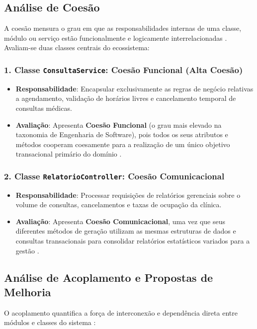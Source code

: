 \subsection{Análise de Coesão}

A coesão mensura o grau em que as responsabilidades internas de uma classe, módulo ou serviço estão funcionalmente e logicamente interrelacionadas \cite{larman2004}. Avaliam-se duas classes centrais do ecossistema:

\subsubsection{1. Classe \texttt{ConsultaService}: Coesão Funcional (Alta Coesão)}
\begin{itemize}
    \item \textbf{Responsabilidade}: Encapsular exclusivamente as regras de negócio relativas a agendamento, validação de horários livres e cancelamento temporal de consultas médicas.
    \item \textbf{Avaliação}: Apresenta \textbf{Coesão Funcional} (o grau mais elevado na taxonomia de Engenharia de Software), pois todos os seus atributos e métodos cooperam coesamente para a realização de um único objetivo transacional primário do domínio \cite{larman2004}.
\end{itemize}

\subsubsection{2. Classe \texttt{RelatorioController}: Coesão Comunicacional}
\begin{itemize}
    \item \textbf{Responsabilidade}: Processar requisições de relatórios gerenciais sobre o volume de consultas, cancelamentos e taxas de ocupação da clínica.
    \item \textbf{Avaliação}: Apresenta \textbf{Coesão Comunicacional}, uma vez que seus diferentes métodos de geração utilizam as mesmas estruturas de dados e consultas transacionais para consolidar relatórios estatísticos variados para a gestão \cite{pressman2016}.
\end{itemize}

\subsection{Análise de Acoplamento e Propostas de Melhoria}

O acoplamento quantifica a força de interconexão e dependência direta entre módulos e classes do sistema \cite{larman2004}:

